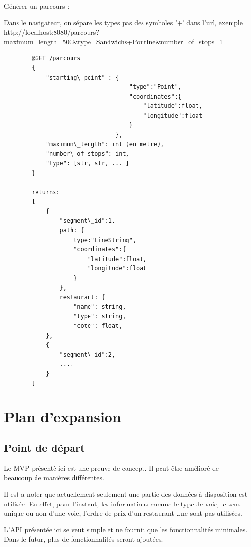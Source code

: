 \documentclass[12pt]{article}
\begin{document}
    Générer un parcours :
    
    Dans le navigateur, on sépare les types pas des symboles '+' dans l'url, exemple http://localhost:8080/parcours?maximum\_length=500\&type=Sandwichs+Poutine\&number\_of\_stops=1
        
    \begin{lstlisting}
        @GET /parcours
        {
            "starting\_point" : {
                                    "type":"Point", 
                                    "coordinates":{
                                        "latitude":float, 
                                        "longitude":float
                                    }
                                },
            "maximum\_length": int (en metre),
            "number\_of_stops": int,
            "type": [str, str, ... ]
        }

        returns:
        [
            {
                "segment\_id":1,
                path: {
                    type:"LineString", 
                    "coordinates":{
                        "latitude":float, 
                        "longitude":float
                    }
                },
                restaurant: {
                    "name": string,
                    "type": string,
                    "cote": float,
            },
            {
                "segment\_id":2,
                ....   
            }
        ]
    \end{lstlisting}
    
\section{Plan d'expansion}

\subsection{Point de départ}

    Le MVP présenté ici est une preuve de concept. Il peut être amélioré de beaucoup de manières différentes.

    Il est a noter que actuellement seulement une partie des données à disposition est utilisée. En effet, pour l'instant, les informations comme le type de voie, le sens unique ou non d'une voie, l'ordre de prix d'un restaurant \dots ne sont pas utilisées.

    L'API présentée ici se veut simple et ne fournit que les fonctionnalités minimales. Dans le futur, plus de fonctionnalités seront ajoutées.
\end{document}
